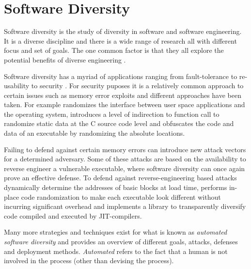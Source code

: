 \section{Software Diversity}

Software diversity is the study of diversity in software and software engineering. It is
a diverse discipline and there is a wide range of research all with different focus and
set of goals. The one common factor is that they all explore the potential benefits of
diverse engineering \cite{survey}.

Software diversity has a myriad of applications ranging from fault-tolerance to re-usability
to security \cite{survey}. For security puposes it is a relatively common approach to
certain issues such as memory error exploits and different approaches have been taken.
For example \textcite{os-randomization} randomizes the interface between user space
applications and the operating system, \textcite{mem-exploits} introduces a level of
indirection to function call to randomize static data at the C source code level and
\textcite{add-obfuscation} obfuscates the code and data of an executable by randomizing
the absolute locations.

Failing to defend against certain memory errors can introduce new attack vectors for a
determined adversary. Some of these attacks are based on the availability to reverse engineer
a vulnerable executable, where software diversity can once again prove an effective defense.
To defend against reverse-engineering based attacks \textcite{binary-stirring} dynamically
determine the addresses of basic blocks at load time, \textcite{smashing-gadgets} performs
in-place code randomization to make each executable look different without incurring
significant overhead and \textcite{librando} implements a library to transparently
diversify code compiled and executed by JIT-compilers.

Many more strategies and techniques exist for what is known as
\textit{automated software diversity} and \textcite{SoK} provides an overview of different
goals, attacks, defenses and deployment methods. \textit{Automated} refers to the fact that
a human is not involved in the process (other than devising the process).


